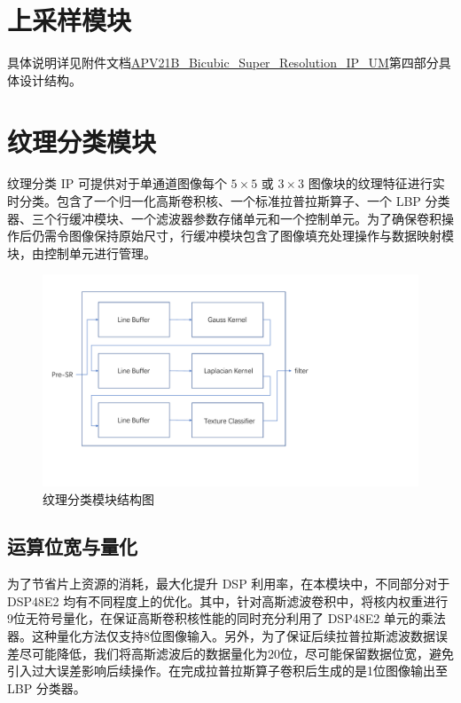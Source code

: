 \documentclass[12pt, a4paper, oneside]{ctexbook}
\begin{document}
	\chapter{上采样模块}
	具体说明详见附件文档\href{run:./pic/APV21B_Bicubic_Super_Resolution_IP_UM.pdf}{APV21B\_Bicubic\_Super\_Resolution\_IP\_UM}第四部分具体设计结构。
	
	\chapter{纹理分类模块}
	纹理分类 IP 可提供对于单通道图像每个 $5\times5$ 或 $3\times3$ 图像块的纹理特征进行实时分类。包含了一个归一化高斯卷积核、一个标准拉普拉斯算子、一个 LBP 分类器、三个行缓冲模块、一个滤波器参数存储单元和一个控制单元。为了确保卷积操作后仍需令图像保持原始尺寸，行缓冲模块包含了图像填充处理操作与数据映射模块，由控制单元进行管理。

	\begin{figure}[h]
	\centering
	\includegraphics[scale=0.55]{./pic/texture}
	\caption{纹理分类模块结构图}
	\label{fig:texture}
	\end{figure}



	\section{运算位宽与量化}
	为了节省片上资源的消耗，最大化提升 DSP 利用率，在本模块中，不同部分对于 DSP48E2 均有不同程度上的优化。其中，针对高斯滤波卷积中，将核内权重进行9位无符号量化，在保证高斯卷积核性能的同时充分利用了 DSP48E2 单元的乘法器。这种量化方法仅支持8位图像输入。另外，为了保证后续拉普拉斯滤波数据误差尽可能降低，我们将高斯滤波后的数据量化为20位，尽可能保留数据位宽，避免引入过大误差影响后续操作。在完成拉普拉斯算子卷积后生成的是1位图像输出至 LBP 分类器。
\end{document}
